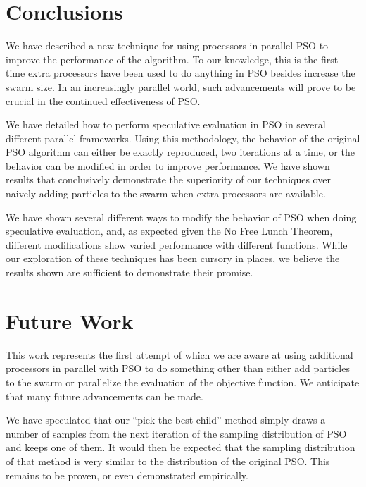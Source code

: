 \documentclass[journal,letterpaper]{IEEEtran}
\begin{document}
\section{Conclusions}
\label{sec:conclusion}

We have described a new technique for using processors in parallel PSO to
improve the performance of the algorithm.  To our knowledge, this is the first
time extra processors have been used to do anything in PSO besides increase the
swarm size.  In an increasingly parallel world, such advancements will prove to
be crucial in the continued effectiveness of PSO.

We have detailed how to perform speculative evaluation in PSO in several
different parallel frameworks.  Using this methodology, the behavior of the
original PSO algorithm can either be exactly reproduced, two iterations at a
time, or the behavior can be modified in order to improve performance.  We have
shown results that conclusively demonstrate the superiority of our techniques
over naively adding particles to the swarm when extra processors are available.

We have shown several different ways to modify the behavior of PSO when doing
speculative evaluation, and, as expected given the No Free Lunch Theorem,
different modifications show varied performance with different functions.
While our exploration of these techniques has been cursory in places, we
believe the results shown are sufficient to demonstrate their promise.

\section{Future Work}
\label{sec:future}

This work represents the first attempt of which we are aware at using
additional processors in parallel with PSO to do something other than either
add particles to the swarm or parallelize the evaluation of the objective
function.  We anticipate that many future advancements can be made.

We have speculated that our ``pick the best child'' method simply draws a
number of samples from the next iteration of the sampling distribution of PSO
and keeps one of them.  It would then be expected that the sampling
distribution of that method is very similar to the distribution of the original
PSO.  This remains to be proven, or even demonstrated empirically.
\end{document}
